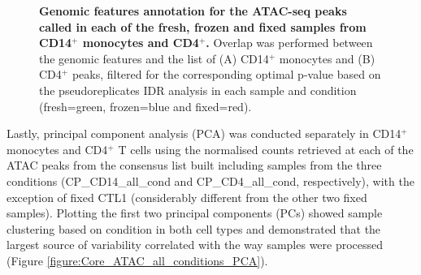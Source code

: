 \begin{figure}[htbp]
\begin{subfigure}{0.5\textwidth}
\caption{\textbf{}}
\end{subfigure}
\caption[Genomic features annotation for the ATAC-seq peaks called in each of the fresh, frozen and fixed samples from CD14$^+$ monocytes and total CD4$^+$.]{\textbf{Genomic features annotation for the ATAC-seq peaks called in each of the fresh, frozen and fixed samples from CD14$^+$ monocytes and CD4$^+$.} Overlap was performed between the genomic features and the list of (A) CD14$^+$ monocytes and (B) CD4$^+$ peaks, filtered for the corresponding optimal p-value based on the pseudoreplicates IDR analysis in each sample and condition (fresh=green, frozen=blue and fixed=red).}
\label{figure:Core_ATAC_all_conditions_genomic_features}
\end{figure} 


Lastly, principal component analysis (PCA) was conducted separately in CD14$^+$ monocytes and CD4$^+$ T cells using the normalised counts retrieved at each of the ATAC peaks from the consensus list built including samples from the three conditions (CP\_CD14\_all\_cond and CP\_CD4\_all\_cond, respectively), with the exception of fixed CTL1 (considerably different from the other two fixed samples). Plotting the first two principal components (PCs) showed sample clustering based on condition in both cell types and demonstrated that the largest source of variability correlated with the way samples were processed (Figure \ref{figure:Core_ATAC_all_conditions_PCA}). 



